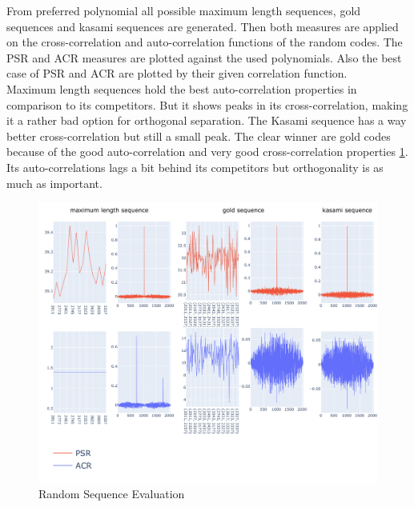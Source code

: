 From preferred polynomial all possible maximum length sequences, gold sequences and kasami sequences are generated. Then both measures are applied on the cross-correlation and auto-correlation functions of the random codes. The PSR and ACR measures are plotted against the used polynomials. Also the best case of PSR and ACR are plotted by their given correlation function.\\
Maximum length sequences hold the best auto-correlation properties in comparison to its competitors. But it shows peaks in its cross-correlation, making it a rather bad option for orthogonal separation. The Kasami sequence has a way better cross-correlation but still a small peak. The clear winner are gold codes because of the good auto-correlation and very good cross-correlation properties \ref{fig:eva}. Its auto-correlations lags a bit behind its competitors but orthogonality is as much as important. 

\begin{figure}[h]
	\includegraphics[width=\linewidth]{images/totaleva}
	
	\caption{Random Sequence Evaluation}
	\label{fig:eva}
\end{figure}
